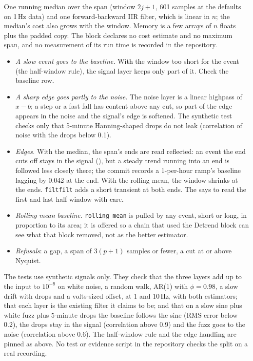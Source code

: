 One running median over the span (window $2j+1$, 601 samples at the defaults on 1\,Hz data) and
one forward-backward IIR filter, which is linear in $n$; the median's cost also grows with the
window. Memory is a few arrays of $n$ floats plus the padded copy. The block declares no cost
estimate and no maximum span, and no measurement of its run time is recorded in the
repository.

\begin{itemize}
\item \emph{A slow event goes to the baseline.} With the window too short for the event (the
  half-window rule), the signal layer keeps only part of it. Check the baseline row.
\item \emph{A sharp edge goes partly to the noise.} The noise layer is a linear highpass of
  $x - b$; a step or a fast fall has content above any cut, so part of the edge appears in the
  noise and the signal's edge is softened. The synthetic test checks only that 5-minute
  Hanning-shaped drops do not leak (correlation of noise with the drops below 0.1).
\item \emph{Edges.} With the median, the span's ends are read reflected: an event the end cuts
  off stays in the signal (), but a
  steady trend running into an end is followed less closely there; the commit records a 1-per-hour
  ramp's baseline lagging by 0.042 at the end. With the rolling mean, the window shrinks at the
  ends. \texttt{filtfilt} adds a short transient at both ends. The  says to read
  the first and last half-window with care.
\item \emph{Rolling mean baseline.} \texttt{rolling\_mean} is pulled by any event, short or long,
  in proportion to its area; it is offered so a chain that used the Detrend block can see what
  that block removed, not as the better estimator.
\item \emph{Refusals}: a gap, a span of $3(p+1)$ samples or fewer, a cut at or above Nyquist.
\end{itemize}

The tests use synthetic signals only. They check that the three layers add up to the input to
$10^{-9}$ on white noise, a random walk, AR(1) with $\phi = 0.98$, a slow drift with drops and a
volts-sized offset, at 1 and 10\,Hz, with both estimators; that each layer is the existing
filter it claims to be; and that on a slow sine plus white fuzz plus 5-minute drops the
baseline follows the sine (RMS error below 0.2), the drops stay in the signal (correlation
above 0.9) and the fuzz goes to the noise (correlation above 0.6). The half-window rule and the
edge handling are pinned as above. No test or evidence script in the repository checks the
split on a real recording.

